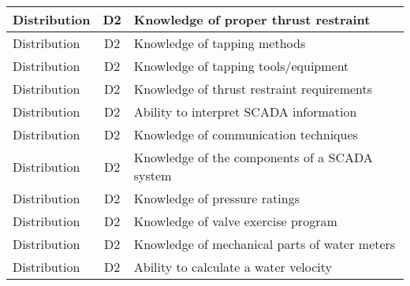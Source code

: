 \documentclass{article}
\begin{document}
\begin{table}[]
\begin{tabular}{|l|c|l|}
Distribution                           & D2             & Knowledge of proper   thrust restraint                                                                                            \\ \hline
Distribution                           & D2             & Knowledge of tapping   methods                                                                                                    \\ \hline
Distribution                           & D2             & Knowledge of tapping   tools/equipment                                                                                            \\ \hline
Distribution                           & D2             & Knowledge of thrust   restraint requirements                                                                                      \\ \hline
Distribution                           & D2             & Ability to interpret   SCADA information                                                                                          \\ \hline
Distribution                           & D2             & Knowledge of   communication techniques                                                                                           \\ \hline
Distribution                           & D2             & Knowledge of the   components of a SCADA system                                                                                   \\ \hline
Distribution                           & D2             & Knowledge of pressure   ratings                                                                                                   \\ \hline
Distribution                           & D2             & Knowledge of valve   exercise program                                                                                             \\ \hline
Distribution                           & D2             & Knowledge of   mechanical parts of water meters                                                                                   \\ \hline
Distribution                           & D2             & Ability to calculate   a water velocity                                                                                           \\ \hline

\end{tabular}
\end{table}
\end{document}

